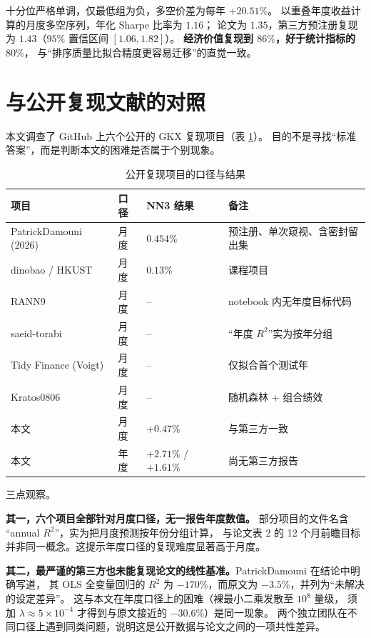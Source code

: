 \documentclass[11pt,a4paper,fontset=windows]{ctexart}
\begin{document}
十分位严格单调，仅最低组为负，多空价差为每年 $+20.51\%$。
以重叠年度收益计算的月度多空序列，年化 Sharpe 比率为 $1.16$；
论文为 $1.35$，第三方预注册复现为 $1.43$（$95\%$ 置信区间 $[1.06,1.82]$）。
\textbf{经济价值复现到 $86\%$，好于统计指标的 $80\%$}，
与``排序质量比拟合精度更容易迁移''的直觉一致。

\section{与公开复现文献的对照}\label{sec:lit}

本文调查了 GitHub 上六个公开的 GKX 复现项目（表 \ref{tab:lit}）。
目的不是寻找``标准答案''，而是判断本文的困难是否属于个别现象。

\begin{table}[htbp]
\centering
\caption{公开复现项目的口径与结果}
\label{tab:lit}
\small
\begin{tabular}{p{4.4cm}p{1.9cm}p{3.3cm}p{4.4cm}}
\toprule
项目 & 口径 & NN3 结果 & 备注 \\
\midrule
PatrickDamouni (2026) & 月度 & $0.454\%$ & 预注册、单次窥视、含密封留出集 \\
dinobao / HKUST & 月度 & $0.13\%$ & 课程项目 \\
RANN9 & 月度 & -- & notebook 内无年度目标代码 \\
saeid-torabi & 月度 & -- & ``年度 $R^2$''实为按年分组 \\
Tidy Finance (Voigt) & 月度 & -- & 仅拟合首个测试年 \\
Kratos0806 & 月度 & -- & 随机森林 + 组合绩效 \\
\midrule
本文 & 月度 & $+0.47\%$ & 与第三方一致 \\
本文 & 年度 & $+2.71\%$ / $+1.61\%$ & 尚无第三方报告 \\
\bottomrule
\end{tabular}
\end{table}

三点观察。

\textbf{其一，六个项目全部针对月度口径，无一报告年度数值。}
部分项目的文件名含 ``annual $R^2$''，实为把月度预测按年份分组计算，
与论文表 2 的 12 个月前瞻目标并非同一概念。这提示年度口径的复现难度显著高于月度。

\textbf{其二，最严谨的第三方也未能复现论文的线性基准。}PatrickDamouni 在结论中明确写道，
其 OLS 全变量回归的 $R^2$ 为 $-170\%$，而原文为 $-3.5\%$，并列为``未解决的设定差异''。
这与本文在年度口径上的困难（裸最小二乘发散至 $10^8$ 量级，
须加 $\lambda\approx5\times10^{-4}$ 才得到与原文接近的 $-30.6\%$）是同一现象。
两个独立团队在不同口径上遇到同类问题，说明这是公开数据与论文之间的一项共性差异。
\end{document}

